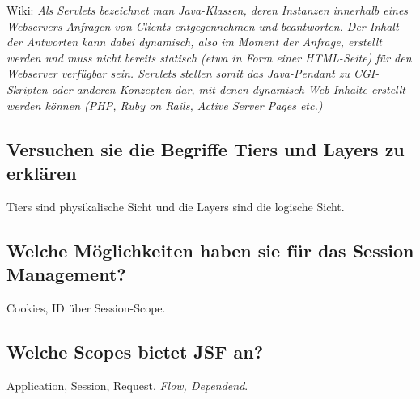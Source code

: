 Wiki: \emph{Als Servlets bezeichnet man Java-Klassen, deren Instanzen innerhalb eines Webservers Anfragen von Clients entgegennehmen und beantworten. Der Inhalt der Antworten kann dabei dynamisch, also im Moment der Anfrage, erstellt werden und muss nicht bereits statisch (etwa in Form einer HTML-Seite) für den Webserver verfügbar sein. Servlets stellen somit das Java-Pendant zu CGI-Skripten oder anderen Konzepten dar, mit denen dynamisch	Web-Inhalte erstellt werden können (PHP, Ruby on Rails, Active Server Pages etc.)}

\subsection{Versuchen sie die Begriffe Tiers und Layers zu erklären}
Tiers sind physikalische Sicht und die Layers sind die logische Sicht.

\subsection{Welche Möglichkeiten haben sie für das Session Management?}
Cookies, ID über Session-Scope.

\subsection{Welche Scopes bietet JSF an?}
Application, Session, Request. \emph{Flow, Dependend}.
